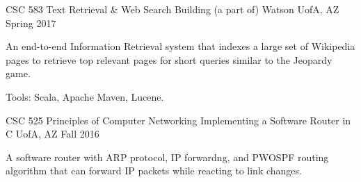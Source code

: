 \begin{cventries}
  \cventry
    {CSC 583 Text Retrieval \& Web Search} %
    {Building (a part of) Watson} %
    {UofA, AZ} %
    {Spring 2017} %
    {
      \begin{cvitems} %
        \item {An end-to-end Information Retrieval system that indexes a large set of Wikipedia pages to retrieve top relevant pages for short queries similar to the Jeopardy game.}
        \item {Tools: Scala, Apache Maven, Lucene.}
      \end{cvitems}
    }
    {}

  \cventry
    {CSC 525 Principles of Computer Networking} %
    {Implementing a Software Router in C} %
    {UofA, AZ} %
    {Fall 2016} %
    {
      \begin{cvitems} %
        \item {A software router with ARP protocol, IP forwardng, and PWOSPF routing algorithm that can forward IP packets while reacting to link changes.}
      \end{cvitems}
    }
    {}


\end{cventries}
